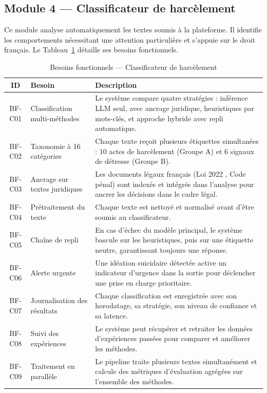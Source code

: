 \subsection{Module 4 — Classificateur de harcèlement}

Ce module analyse automatiquement les textes soumis à la plateforme.
Il identifie les comportements nécessitant une attention particulière et s'appuie sur le droit français.
Le Tableau~\ref{tab:bf_class} détaille ses besoins fonctionnels.

\vspace{6pt}
\begin{table}[H]
\caption{Besoins fonctionnels — Classificateur de harcèlement}
\label{tab:bf_class}
\centering
\small
\setlength{\tabcolsep}{4pt}
\begin{tabular}{|c|p{3.5cm}|p{9.5cm}|}
\hline
\textbf{ID} & \textbf{Besoin} & \textbf{Description} \\
\hline
BF-C01 & Classification multi-méthodes
        & Le système compare quatre stratégies : inférence LLM seul, avec ancrage juridique, heuristiques par mots-clés, et approche hybride avec repli automatique. \\
\hline
BF-C02 & Taxonomie à 16 catégories
        & Chaque texte reçoit plusieurs étiquettes simultanées : 10 actes de harcèlement (Groupe A) et 6 signaux de détresse (Groupe B). \\
\hline
BF-C03 & Ancrage sur textes juridiques
        & Les documents légaux français (Loi 2022 \cite{sparkloi}, Code pénal) sont indexés et intégrés dans l'analyse pour ancrer les décisions dans le cadre légal. \\
\hline
BF-C04 & Prétraitement du texte
        & Chaque texte est nettoyé et normalisé avant d'être soumis au classificateur. \\
\hline
BF-C05 & Chaîne de repli
        & En cas d'échec du modèle principal, le système bascule sur les heuristiques, puis sur une étiquette neutre, garantissant toujours une réponse. \\
\hline
BF-C06 & Alerte urgente
        & Une idéation suicidaire détectée active un indicateur d'urgence dans la sortie pour déclencher une prise en charge prioritaire. \\
\hline
BF-C07 & Journalisation des résultats
        & Chaque classification est enregistrée avec son horodatage, sa stratégie, son niveau de confiance et sa latence. \\
\hline
BF-C08 & Suivi des expériences
        & Le système peut récupérer et retraiter les données d'expériences passées pour comparer et améliorer les méthodes. \\
\hline
BF-C09 & Traitement en parallèle
        & Le pipeline traite plusieurs textes simultanément et calcule des métriques d'évaluation agrégées sur l'ensemble des méthodes. \\
\hline
\end{tabular}
\end{table}

